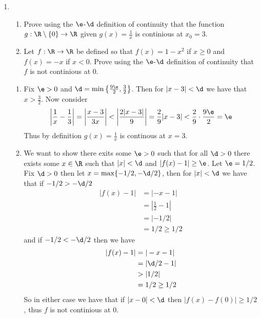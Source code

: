\documentclass[11pt]{exam}
\begin{document}
\begin{enumerate}
        \item \begin{enumerate}
            \item Prove using the $\e$-$\d$ definition of continuity that the function $g: \R \setminus \{0\} \to \R$ given $g(x) = \frac{1}{x}$ is continious at $x_0 = 3$.
            \item Let $f: \R \to \R$ be defined so that $f(x) = 1 - x^2$ if $x \geq 0$ and $f(x) = -x$ if $x < 0$.
            Prove using the $\e$-$\d$ definition of continuity that $f$ is not continious at 0.
        \end{enumerate}
            \begin{solution}
                \begin{enumerate}
                    \item Fix $\e > 0$ and $\d =\min \left\{\frac{9\e}{2}, \frac{3}{2}\right\}$. Then for $|x-3| < \d$ we have that $x > \frac{3}{2}$. Now consider 
                    $$\left| \dfrac{1}{x} - \dfrac{1}{3}\right| = 
                    \left|\dfrac{x-3}{3x}\right| < \left|\dfrac{2|x-3|}{9}\right| = \frac{2}{9} |x-3| < \frac{2}{9} \cdot \frac{9\e}{2} = \e
                    $$
                    Thus by definition $g(x) = \frac{1}{x}$ is continous at $x = 3$.
                    \item We want to show there exits some $\e > 0$ such that for all $\d > 0$ there exists some $x \in \R$ such that $|x| < \d$ and $|f(x)-1| \geq \e$. Let $\e = 1/2$. Fix $\d > 0$ then let $x = \max\{-1/2, -\d/2\}$, then for $|x| < \d$ we have that if $-1/2 > -\d/2$ 
                    \begin{align*} 
                        |f(x)-1| &= |-x - 1| \\
                                &= |\frac{1}{2} - 1| \\
                                &= |-1/2| \\
                                &= 1/2 \geq 1/2
                    \end{align*}
                    and if $-1/2 < -\d/2$ then we have 
                    \begin{align*}
                        |f(x)-1| &= |-x - 1| \\
                                &= |\d/2 - 1| \\
                                &> |1/2| \\
                                &= 1/2 \geq 1/2
                    \end{align*}
                    So in either case we have that if $|x - 0| < \d$ then $|f(x) - f(0)| \geq 1/2$, thus $f$ is not continious at 0. 
                \end{enumerate}
            \end{solution}


\end{enumerate}
\end{document}
